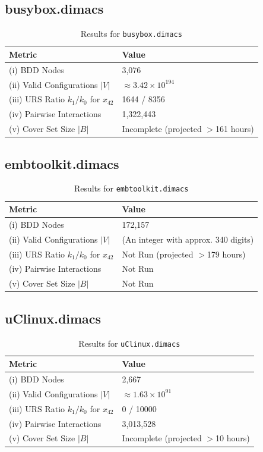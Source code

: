 \documentclass{article}
\begin{document}
\subsection{busybox.dimacs}
\begin{table}[H]
\centering
\caption{Results for \texttt{busybox.dimacs}}
\begin{tabular}{l l}
\toprule
\textbf{Metric} & \textbf{Value} \\
\midrule
(i) BDD Nodes & 3,076 \\
(ii) Valid Configurations $|V|$ & $\approx 3.42 \times 10^{194}$ \\
(iii) URS Ratio $k_1/k_0$ for $x_{42}$ & 1644 / 8356 \\
(iv) Pairwise Interactions & 1,322,443 \\
(v) Cover Set Size $|B|$ & Incomplete (projected $>$161 hours) \\
\bottomrule
\end{tabular}
\end{table}

\subsection{embtoolkit.dimacs}
\begin{table}[H]
\centering
\caption{Results for \texttt{embtoolkit.dimacs}}
\begin{tabular}{l p{7cm}}
\toprule
\textbf{Metric} & \textbf{Value} \\
\midrule
(i) BDD Nodes & 172,157 \\
(ii) Valid Configurations $|V|$ & (An integer with approx. 340 digits) \\
(iii) URS Ratio $k_1/k_0$ for $x_{42}$ & Not Run (projected $>$179 hours) \\
(iv) Pairwise Interactions & Not Run \\
(v) Cover Set Size $|B|$ & Not Run \\
\bottomrule
\end{tabular}
\end{table}

\subsection{uClinux.dimacs}
\begin{table}[H]
\centering
\caption{Results for \texttt{uClinux.dimacs}}
\begin{tabular}{l l}
\toprule
\textbf{Metric} & \textbf{Value} \\
\midrule
(i) BDD Nodes & 2,667 \\
(ii) Valid Configurations $|V|$ & $\approx 1.63 \times 10^{91}$ \\
(iii) URS Ratio $k_1/k_0$ for $x_{42}$ & 0 / 10000 \\
(iv) Pairwise Interactions & 3,013,528 \\
(v) Cover Set Size $|B|$ & Incomplete (projected $>$10 hours) \\
\bottomrule
\end{tabular}
\end{table}
\end{document}
